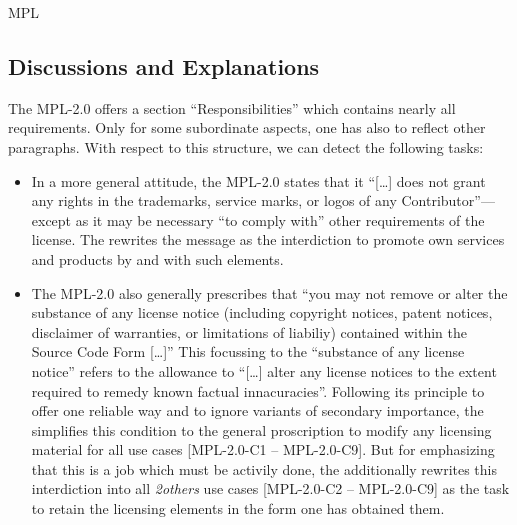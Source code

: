 \begin{license}{MPL}

\subsection{Discussions and Explanations}

The MPL-2.0 offers a section \enquote{Responsibilities} which contains nearly all
requirements. Only for some subordinate aspects, one has also to
reflect other paragraphs.
With respect to this structure, we can detect the following tasks:

\begin{itemize}

\item In a more general attitude, the MPL-2.0 states that it \enquote{[\ldots]
  does not grant any rights in the trademarks, service marks, or logos of any
  Contributor}---except as it may be necessary \enquote{to comply with} other
  requirements of the license. The \oslic{} rewrites the message
  as the interdiction to promote own services and products by and with such
  elements. 
  
\item The MPL-2.0 also generally prescribes that \enquote{you may not remove or
  alter the substance of any license notice (including copyright notices, patent
  notices, disclaimer of warranties, or limitations of liabiliy) contained
  within the Source Code Form [\ldots]} This focussing to the
  \enquote{substance of any license notice} refers to the allowance to
  \enquote{[\ldots] alter any license notices to the extent required to remedy
  known factual innacuracies}.  Following its principle to offer
  one reliable way and to ignore variants of secondary importance, the \oslic{}
  simplifies this condition to the general proscription to modify any licensing
  material for all use cases [MPL-2.0-C1 -- MPL-2.0-C9]. But for emphasizing
  that this is a job which must be activily done, the \oslic{} additionally
  rewrites this interdiction into all \emph{2others} use cases [MPL-2.0-C2 --
  MPL-2.0-C9] as the task to retain the licensing elements in the form one has
  obtained them. 
  

\end{itemize}
\end{license}
